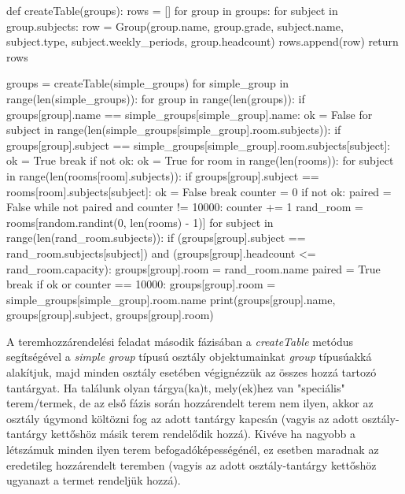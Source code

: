 \documentclass[12pt,a4paper]{report}
\begin{document}
\begin{python}
def createTable(groups):
    rows = []
    for group in groups:
        for subject in group.subjects:
            row = Group(group.name, group.grade, subject.name, subject.type, subject.weekly_periods, group.headcount)
            rows.append(row)
    return rows


groups = createTable(simple_groups)
for simple_group in range(len(simple_groups)):
    for group in range(len(groups)):
        if groups[group].name == simple_groups[simple_group].name:
            ok = False
            for subject in range(len(simple_groups[simple_group].room.subjects)):
                if groups[group].subject == simple_groups[simple_group].room.subjects[subject]:
                    ok = True
                    break
            if not ok:
                ok = True
                for room in range(len(rooms)):
                    for subject in range(len(rooms[room].subjects)):
                        if groups[group].subject == rooms[room].subjects[subject]:
                            ok = False
                            break
            counter = 0
            if not ok:
                paired = False
                while not paired and counter != 10000:
                    counter += 1
                    rand_room = rooms[random.randint(0, len(rooms) - 1)]
                    for subject in range(len(rand_room.subjects)):
                        if (groups[group].subject == rand_room.subjects[subject]) and (groups[group].headcount <= rand_room.capacity):
                            groups[group].room = rand_room.name
                            paired = True
                            break
            if ok or counter == 10000:
                groups[group].room = simple_groups[simple_group].room.name
            print(groups[group].name, groups[group].subject, groups[group].room)
\end{python}

A teremhozzárendelési feladat második fázisában a \textsl{createTable} metódus segítségével a \textsl{simple group} típusú osztály objektumainkat \textsl{group} típusúakká alakítjuk, majd minden osztály esetében végignézzük az összes hozzá tartozó tantárgyat. Ha találunk olyan tárgya(ka)t, mely(ek)hez van "speciális" terem/termek, de az első fázis során hozzárendelt terem nem ilyen, akkor az osztály úgymond költözni fog az adott tantárgy kapcsán (vagyis az adott osztály-tantárgy kettőshöz másik terem rendelődik hozzá). Kivéve ha nagyobb a létszámuk minden ilyen terem befogadóképességénél, ez esetben maradnak az eredetileg hozzárendelt teremben (vagyis az adott osztály-tantárgy kettőshöz ugyanazt a termet rendeljük hozzá).
\end{document}
